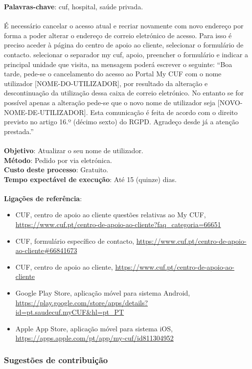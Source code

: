 \textbf{Palavras-chave}: cuf, hospital, saúde privada. \\
\\
É necessário cancelar o acesso atual e recriar novamente com novo
endereço por forma a poder alterar o endereço de correio eletrónico de
acesso. Para isso é preciso aceder à página do centro de apoio ao
cliente, selecionar o formulário de contacto. selecionar o separador my
cuf, apoio, preencher o formulário e indicar a principal unidade que
visita, na mensagem poderá escrever o seguinte: ``Boa tarde, pede-se o
cancelamento do acesso ao Portal My CUF com o nome utilizador
{[}NOME-DO-UTILIZADOR{]}, por resultado da alteração e descontinuação da
utilização dessa caixa de correio eletrónico. No entanto se for possível
apenas a alteração pede-se que o novo nome de utilizador seja
{[}NOVO-NOME-DE-UTILIZADOR{]}. Esta comunicação é feita de acordo com o
direito previsto no artigo 16.º (décimo sexto) do RGPD. Agradeço desde
já a atenção prestada.''\\
\\
\textbf{Objetivo}: Atualizar o seu nome de utilizador. \\
\textbf{Método}: Pedido por via eletrónica. \\
\textbf{Custo deste processo}: Gratuito. \\
\textbf{Tempo expectável de execução}: Até 15 (quinze) dias. \\
\\
\textbf{Ligações de referência}:
\begin{itemize}
	\item CUF, centro de apoio ao cliente questões relativas ao My CUF, \url{https://www.cuf.pt/centro-de-apoio-ao-cliente?faq\_categoria=66651}
	\item CUF, formulário específico de contacto, \url{https://www.cuf.pt/centro-de-apoio-ao-cliente\#66841673}
	\item CUF, centro de apoio ao cliente, \url{https://www.cuf.pt/centro-de-apoio-ao-cliente}
	\item Google Play Store, aplicação móvel para sistema Android, \url{https://play.google.com/store/apps/details?id=pt.saudecuf.myCUF\&hl=pt\_PT}
	\item Apple App Store, aplicação móvel para sistema iOS, \url{https://apps.apple.com/pt/app/my-cuf/id811304952}
\end{itemize}

\newpage

\subsubsection{Sugestões de contribuição}

